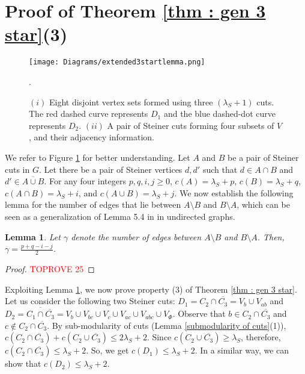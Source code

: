 \documentclass[letterpaper,11pt]{article}
\newtheorem{lemma}{Lemma}[]
\begin{document}

\newpage
\appendix


\section{Proof of Theorem \ref{thm : gen 3 star}(3)} \label{app : gen 3 star extended}


  \begin{figure}
 \centering
    \texttt{[image: Diagrams/extended3startlemma.png]} 
   \caption{$(i)$ Eight disjoint vertex sets formed using three $(\lambda_S+1)$ cuts. The red dashed curve represents $D_1$ and the blue dashed-dot curve represents $D_2$. $(ii)$ A pair of Steiner cuts forming four subsets of $V$, and their adjacency information.} 
  \label{fig : extended gen 3 star}. 
\end{figure}

We refer to Figure \ref{fig : extended gen 3 star} for better understanding. Let $A$ and $B$ be a pair of Steiner cuts in $G$. Let there be a pair of Steiner vertices $d,d'$ such that $d\in A\cap B$ and $d'\in \overline{A\cup B}$. For any four integers $p,q,i,j\ge 0$,  $c(A)=\lambda_S+p$, $c(B)=\lambda_S+q$, $c(A\cap B)=\lambda_S+i$, and $c(A\cup B)=\lambda_S+j$. We now establish the following lemma for the number of edges that lie between $A\setminus B$ and $B\setminus A$, which can be seen as a generalization of Lemma 5.4 in \cite{DBLP:journals/talg/BaswanaBP23} in undirected graphs.
\begin{lemma} \label{lem : gamma value}
 Let $\gamma$ denote the number of edges between $A\setminus B$ and $B\setminus A$. Then, $\gamma=\frac{p+q-i-j}{2}$.
\end{lemma}
\begin{proof}\textcolor{red}{TOPROVE 25}\end{proof}
Exploiting Lemma \ref{lem : gamma value}, we now prove property (3) of Theorem \ref{thm : gen 3 star}. Let us consider the following two Steiner cuts: $D_1=C_2\cap \overline{C_3}=V_b\cup V_{ab}$ and $D_2=\overline{C_1\cap \overline{C_3}}=V_b\cup V_{bc} \cup V_{c}\cup V_{ac}\cup V_{abc} \cup V_{\Phi}$. Observe that $b\in C_2\cap \overline{C_3}$ and $c\notin C_2\cap \overline{C_3}$. By sub-modularity of cuts (Lemma \ref{submodularity of cuts}(1)), $c(C_2\cap \overline{C_3})+c(C_2\cup \overline{C_3})\le 2\lambda_S+2$. Since $c(C_2\cup \overline{C_3})\ge \lambda_S$, therefore, $c(C_2\cap \overline{C_3})\le \lambda_S+2$. So, we get $c(D_1)\le \lambda_S+2$. In a similar way, we can show that $c(D_2)\le \lambda_S+2$. 
\end{document}
